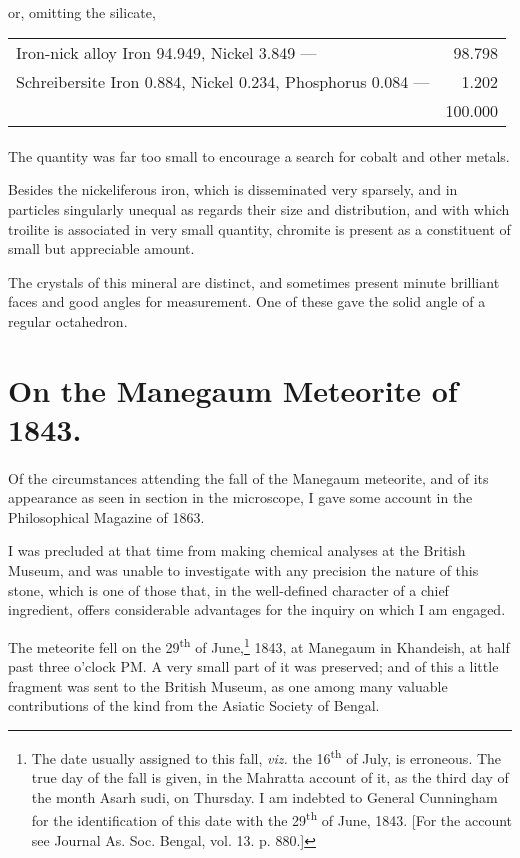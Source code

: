 \documentclass[a4paper, 12pt, oneside]{article}
\begin{document}
\paragraph{}
or, omitting the silicate,
\begin{table}[H]
    \centering
    \footnotesize
    \begin{tabular}{l r}
        Iron-nick alloy {Iron 94.949, Nickel 3.849} --- & 98.798\\
        Schreibersite {Iron 0.884, Nickel 0.234, Phosphorus 0.084} --- & 1.202\\ \hline
        ~ & 100.000
    \end{tabular}
\end{table}
\paragraph{}
The quantity was far too small to encourage a search for cobalt and other metals.

Besides the nickeliferous iron, which is disseminated very sparsely, and in particles singularly unequal as regards their size and distribution, and with which troilite is associated in very small quantity, chromite is present as a constituent of small but appreciable amount.

The crystals of this mineral are distinct, and sometimes present minute brilliant faces and good angles for measurement. One of these gave the solid angle of a regular octahedron.
\clearpage
\section{On the Manegaum Meteorite of 1843.}
\paragraph{}
Of the circumstances attending the fall of the Manegaum meteorite, and of its appearance as seen in section in the microscope, I gave some account in the Philosophical Magazine of 1863.

I was precluded at that time from making chemical analyses at the British Museum, and was unable to investigate with any precision the nature of this stone, which is one of those that, in the well-defined character of a chief ingredient, offers considerable advantages for the inquiry on which I am engaged.

The meteorite fell on the 29\textsuperscript{th} of June,\footnote{The date usually assigned to this fall, \emph{viz.} the 16\textsuperscript{th} of July, is erroneous. The true day of the fall is given, in the Mahratta account of it, as the third day of the month Asarh sudi, on Thursday. I am indebted to General Cunningham for the identification of this date with the 29\textsuperscript{th} of June, 1843. [For the account see Journal As. Soc. Bengal, vol. 13. p. 880.]} 1843, at Manegaum in Khandeish, at half past three o'clock PM. A very small part of it was preserved; and of this a little fragment was sent to the British Museum, as one among many valuable contributions of the kind from the Asiatic Society of Bengal.
\end{document}
